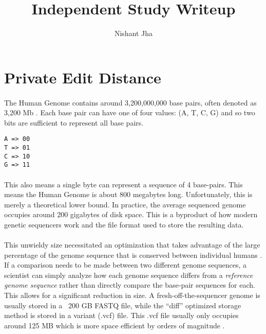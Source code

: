 \documentclass[12pt]{article}
\begin{document}
\author{Nishant Jha}
\title{Independent Study Writeup}

\maketitle

\section{Private Edit Distance}

\paragraph{}
The Human Genome contains around 3,200,000,000 base pairs, often denoted as 3,200 Mb \cite{naturegene}. Each base pair can have one of four values: (A, T, C, G) and so two bits are sufficient to represent all base pairs.

\begin{verbatim}
A => 00
T => 01
C => 10
G => 11
\end{verbatim}

\paragraph{}
This also means a single byte can represent a sequence of 4 base-pairs. This means the Human Genome is about 800 megabytes long. Unfortunately, this is merely a theoretical lower bound. In practice, the average sequenced genome occupies around 200 gigabytes of disk space. This is a byproduct of how modern genetic sequencers work and the file format used to store the resulting data.

\paragraph{}
This unwieldy size necessitated an optimization that takes advantage of the large percentage of the genome sequence that is conserved between individual humans \cite{nihfaq}. If a comparison needs to be made between two different genome sequences, a scientist can simply analyze how each genome sequence differs from a \textit{reference genome sequence} rather than directly compare the base-pair sequences for each. This allows for a significant reduction in size. A fresh-off-the-sequencer genome is usually stored in a ~200 GB FASTQ file, while the ``diff'' optimized storage method is stored in a variant (.vcf) file. This .vcf file usually only occupies around 125 MB which is more space efficient by orders of magnitude \cite{vcf}.
\end{document}
